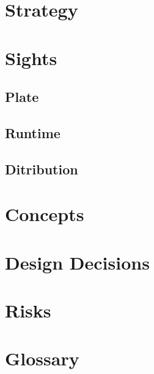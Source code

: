 \documentclass[11pt]{article}
\begin{document}
    \section{Strategy}

    \section{Sights}

    \subsection{Plate}
    \subsection{Runtime}
    \subsection{Ditribution}

    \section{Concepts}

    \section{Design Decisions}

    \section{Risks}

    \section{Glossary}
\end{document}
